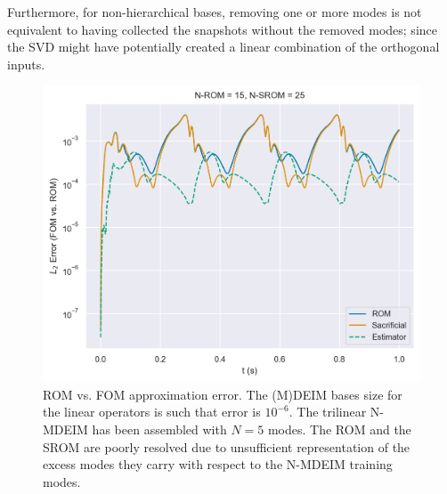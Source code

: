 \documentclass[../../thesis.tex]{subfiles}
\begin{document}
Furthermore, for non-hierarchical bases, removing one or more modes is not equivalent
to having collected the snapshots without the removed modes; 
since the SVD might have potentially created a linear combination of the orthogonal inputs.

\newpage
\begin{figure}[h]
    \includegraphics[width =\columnwidth]{research_project/piston/figures/nonlinear_displacement/arbitrary/error_estimation_rom_15_srom_25_modes_5.png}
    \caption{ROM vs. FOM approximation error.
    The (M)DEIM bases size for the linear operators is such that error is $10^{-6}$.
    The trilinear N-MDEIM has been assembled with $N=5$ modes.
    The ROM and the SROM are poorly resolved due to unsufficient representation of the excess
    modes they carry with respect to the N-MDEIM training modes.}
    \label{fig:nlinear_disp_modes_5_rom_15}
\end{figure}
\end{document}
